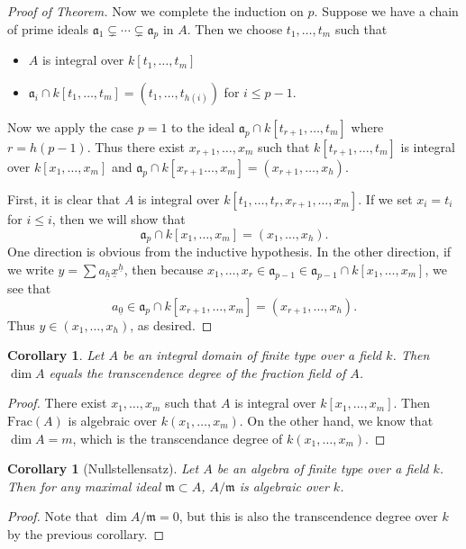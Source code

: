 \documentclass[leqno, openany]{memoir}
\newtheorem{cor}[thm]{Corollary}
\theoremstyle{definition}
\theoremstyle{remark}
\theoremstyle{plain}
\theoremstyle{definition}
\theoremstyle{remark}
\newcommand{\mf}[1]{\mathfrak{#1}}
\newcommand{\mr}[1]{\mathrm{#1}}
\newcommand{\ul}[1]{\underline{#1}}
\begin{document}
\begin{proof}[Proof of Theorem]
    Now we complete the induction on $p$. Suppose we have a chain of prime
    ideals $\mf{a}_1 \subsetneq \cdots \subsetneq \mf{a}_p$ in $A$. Then we
    choose $t_1, \ldots, t_m$ such that \begin{itemize} \item $A$ is integral
        over $k[t_1, \ldots, t_m]$ \item $\mf{a}_i \cap k[t_1, \ldots, t_m] =
(t_1, \ldots, t_{h(i)})$ for $i \leq p-1$.  \end{itemize} Now we apply the case
$p = 1$ to the ideal $\mf{a}_p \cap k[t_{r+1}, \ldots, t_m]$ where $r =
h(p-1)$. Thus there exist $x_{r+1}, \ldots, x_m$ such that $k[t_{r+1}, \ldots,
t_m]$ is integral over $k[x_1, \ldots, x_m]$ and $\mf{a}_p \cap k[x_{r+1}
\ldots, x_m] = (x_{r+1}, \ldots, x_h)$.

    First, it is clear that $A$ is integral over $k[t_1, \ldots, t_r, x_{r+1},
    \ldots, x_m]$. If we set $x_i = t_i$ for $i \leq i$, then we will show that
    \[ \mf{a}_p \cap k[x_1, \ldots, x_m] = (x_1, \ldots, x_h). \] One direction
    is obvious from the inductive hypothesis. In the other direction, if we
    write $y = \sum a_{\ul{h}} \ul{x}^{\ul{h}}$, then because $x_1, \ldots, x_r
    \in \mf{a}_{p-1} \in \mf{a}_{p-1} \cap k[x_1, \ldots, x_m]$, we see that \[
    a_{\ul{0}} \in \mf{a}_p \cap k[x_{r+1}, \ldots, x_m] = (x_{r+1}, \ldots,
x_h). \] Thus $y \in (x_1, \ldots, x_h)$, as desired.  \end{proof}

\begin{cor} Let $A$ be an integral domain of finite type over a field $k$. Then
$\dim A$ equals the transcendence degree of the fraction field of $A$.
\end{cor}

\begin{proof} There exist $x_1, \ldots, x_m$ such that $A$ is integral over
    $k[x_1, \ldots, x_m]$. Then $\mr{Frac}(A)$ is algebraic over $k(x_1,
    \ldots, x_m)$. On the other hand, we know that $\dim A = m$, which is the
    transcendance degree of $k(x_1, \ldots, x_m)$.  \end{proof}

\begin{cor}[Nullstellensatz] Let $A$ be an algebra of finite type over a field
$k$. Then for any maximal ideal $\mf{m} \subset A$, $A / \mf{m}$ is algebraic
over $k$.  \end{cor}

\begin{proof} Note that $\dim A/\mf{m} = 0$, but this is also the transcendence
degree over $k$ by the previous corollary.  \end{proof}
\end{document}
